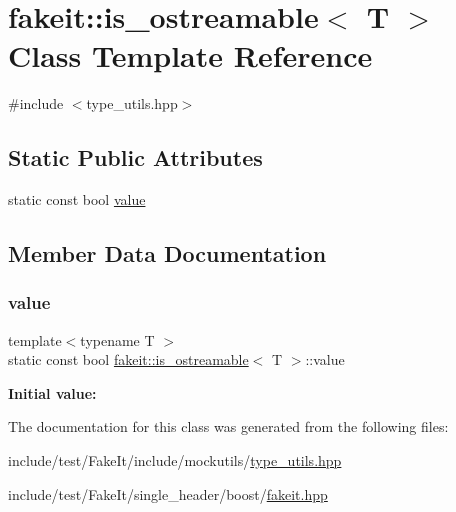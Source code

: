 \hypertarget{classfakeit_1_1is__ostreamable}{}\section{fakeit\+::is\+\_\+ostreamable$<$ T $>$ Class Template Reference}
\label{classfakeit_1_1is__ostreamable}


{\ttfamily \#include $<$type\+\_\+utils.\+hpp$>$}

\subsection*{Static Public Attributes}
\begin{DoxyCompactItemize}
\item 
static const bool \mbox{\hyperlink{classfakeit_1_1is__ostreamable_a7e6abfa3af88d5d76ad4ebe116e58920}{value}}
\end{DoxyCompactItemize}


\subsection{Member Data Documentation}
\mbox{\label{classfakeit_1_1is__ostreamable_a7e6abfa3af88d5d76ad4ebe116e58920}} 
\subsubsection{\texorpdfstring{value}{value}}
{\footnotesize\ttfamily template$<$typename T $>$ \\
static const bool \mbox{\hyperlink{classfakeit_1_1is__ostreamable}{fakeit\+::is\+\_\+ostreamable}}$<$ T $>$\+::value\hspace{0.3cm}{\ttfamily [static]}}

{\bfseries Initial value\+:}
\begin{DoxyCode}{0}
\DoxyCodeLine{=}

\end{DoxyCode}


The documentation for this class was generated from the following files\+:\begin{DoxyCompactItemize}
\item 
include/test/\+Fake\+It/include/mockutils/\mbox{\hyperlink{type__utils_8hpp}{type\+\_\+utils.\+hpp}}\item 
include/test/\+Fake\+It/single\+\_\+header/boost/\mbox{\hyperlink{single__header_2boost_2fakeit_8hpp}{fakeit.\+hpp}}\end{DoxyCompactItemize}
